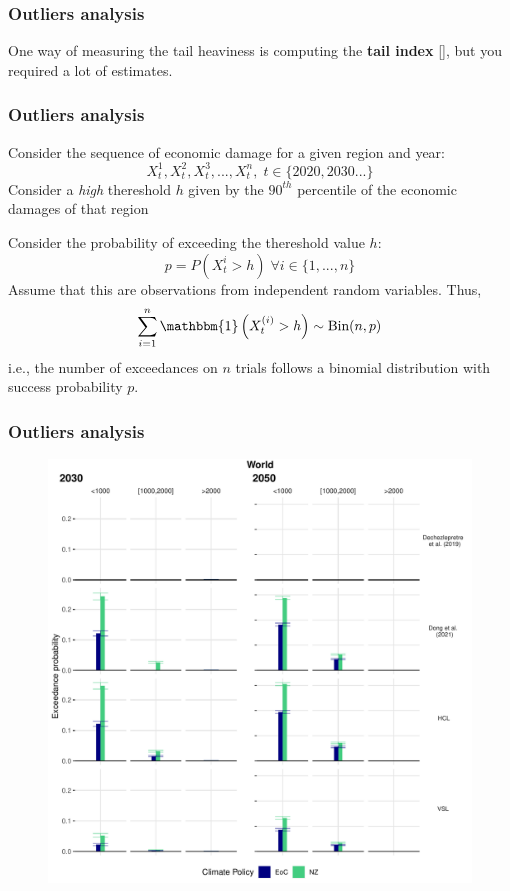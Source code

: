 \begin{frame}
    \frametitle{Outliers analysis}
    One way of measuring the tail heaviness is computing the \textbf{tail index} [\cite{haan_extreme_2006}]\pause, \textcolor{myred}{but you required a lot of estimates.}

    \vspace{0.5cm}
\end{frame}
\begin{frame}
    \frametitle{Outliers analysis}
    Consider the sequence of economic damage for a given region and year: 
    \[ X_t^1, X_t^2, X_t^3, ..., X_t^n, \; t \in \{2020, 2030 ...\} \]
    \pause Consider a \textit{high} thereshold $h$ given by the $90^{th}$ percentile of the economic damages of that region

    \pause Consider the probability of exceeding the thereshold value $h$:
    \[ p = P(X_t^i > h) \; \forall i \in \{1,...,n\}\]
    \pause Assume that this are observations from independent random variables. Thus,
    \[ \sum_{i = 1}^n \mathbbm{1}\left( X_t^{(i)} > h\right) \sim \text{Bin}(n,p) \] 
    i.e., the number of exceedances on $n$ trials follows a binomial distribution with success probability $p$.
\end{frame}
\begin{frame}
    \frametitle{Outliers analysis}
    \begin{figure}[htb!]
        \centering
        \includegraphics[width = 0.6\linewidth]{Images_statistical_meth/tail_heaviness_WORLD.pdf}
    \end{figure}    
    \vfill \hfill \tiny{\cite{rodes-bachs_beyond_ap}}
\end{frame}


